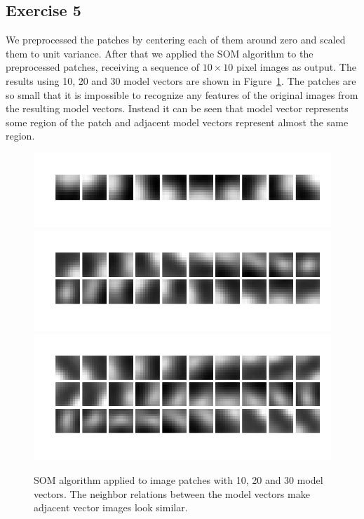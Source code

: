 \documentclass{article}
\begin{document}
\subsection{Exercise 5}
We preprocessed the patches by centering each of them around zero and scaled them to unit variance.
After that we applied the SOM algorithm to the preprocessed patches, receiving a sequence of $10\times 10$ pixel images as output.
The results using 10, 20 and 30 model vectors are shown in Figure~\ref{fig:patch}.
The patches are so small that it is impossible to recognize any features of the original images from the resulting model vectors.
Instead it can be seen that model vector represents some region of the patch and adjacent model vectors represent almost the same region.

\begin{figure}
	\includegraphics[width=\columnwidth]{patch10}
	\includegraphics[width=\columnwidth]{patch20}
	\includegraphics[width=\columnwidth]{patch30}
	\caption{SOM algorithm applied to image patches with 10, 20 and 30 model vectors. The neighbor relations between the model vectors make adjacent vector images look similar.}\label{fig:patch}
\end{figure}
\end{document}
